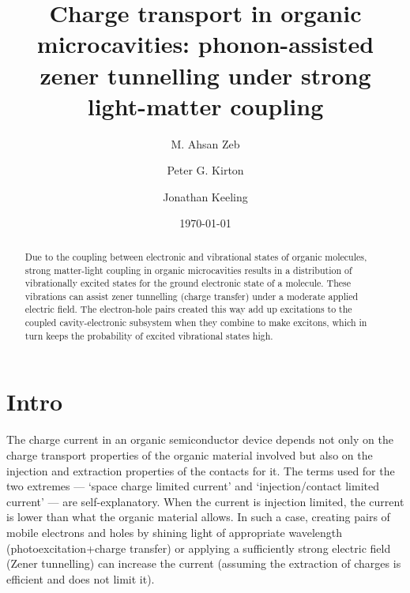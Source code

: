 \documentclass[a4paper,twocolumn]{revtex4-1} %
\begin{document}
\title{Charge transport in organic microcavities: phonon-assisted zener tunnelling under strong light-matter coupling}

\author{M. Ahsan Zeb}
\author{Peter G. Kirton}
\author{Jonathan Keeling}
\date{\today}

\begin{abstract}
Due to the coupling between electronic and vibrational states of organic molecules,
strong matter-light coupling in organic microcavities results
in a distribution of vibrationally excited states
 for the ground electronic state of a molecule.
These vibrations can assist zener tunnelling (charge transfer) 
under a moderate applied electric field.
The electron-hole pairs created this way
add up excitations to the coupled cavity-electronic subsystem when they combine to make excitons,
which in turn keeps the probability of excited vibrational states
high.
\end{abstract}

\maketitle

\section{Intro}
The charge current in an organic semiconductor device
depends not only on the charge transport properties of
 the organic material involved but also on
  the injection and extraction properties of the contacts
  for it.
  The terms used for the two extremes ---  `space charge limited current'
 and `injection/contact limited current' ---
 are self-explanatory.
 When the current is injection limited,
 the current is lower than what the organic material allows.
In such a case,
creating pairs of mobile electrons and holes
by
shining light of appropriate wavelength (photoexcitation+charge transfer) or 
applying a sufficiently strong electric field (Zener tunnelling) can increase the current 
(assuming the extraction of charges is efficient and does not limit it).
\end{document}
